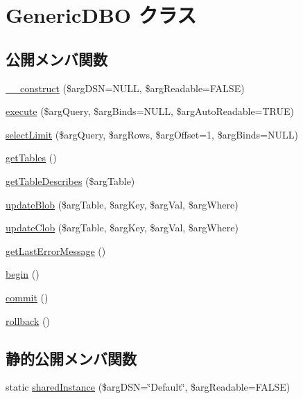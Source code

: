 \hypertarget{class_generic_d_b_o}{}\section{Generic\+D\+B\+O クラス}
\label{class_generic_d_b_o}
\subsection*{公開メンバ関数}
\begin{DoxyCompactItemize}
\item 
\hyperlink{class_generic_d_b_o_a43687f2b92b21e709336c42b140b2260}{\+\_\+\+\_\+construct} (\$arg\+D\+S\+N=N\+U\+L\+L, \$arg\+Readable=F\+A\+L\+S\+E)
\item 
\hyperlink{class_generic_d_b_o_aa5b7d961b4297b9aa75baecfdc7d7e5e}{execute} (\$arg\+Query, \$arg\+Binds=N\+U\+L\+L, \$arg\+Auto\+Readable=T\+R\+U\+E)
\item 
\hyperlink{class_generic_d_b_o_af903a44ae7f95879e1bab1fb2ca16450}{select\+Limit} (\$arg\+Query, \$arg\+Rows, \$arg\+Offset=1, \$arg\+Binds=N\+U\+L\+L)
\item 
\hyperlink{class_generic_d_b_o_a9c5bcfb5e09fd7bad746ad57b34415c0}{get\+Tables} ()
\item 
\hyperlink{class_generic_d_b_o_a8db36514aa3f653b8d7642855a1b8188}{get\+Table\+Describes} (\$arg\+Table)
\item 
\hyperlink{class_generic_d_b_o_a3037e110cc320ad3cc63d68894ba1a54}{update\+Blob} (\$arg\+Table, \$arg\+Key, \$arg\+Val, \$arg\+Where)
\item 
\hyperlink{class_generic_d_b_o_a39d5c487e235013fdd186fd8960b3f5a}{update\+Clob} (\$arg\+Table, \$arg\+Key, \$arg\+Val, \$arg\+Where)
\item 
\hyperlink{class_generic_d_b_o_a81277b8636d6a2d29e6fe993024f703b}{get\+Last\+Error\+Message} ()
\item 
\hyperlink{class_generic_d_b_o_a19a06d2fa3a5770765358c09602a9b75}{begin} ()
\item 
\hyperlink{class_generic_d_b_o_a9054647399f072971033252d135e71d3}{commit} ()
\item 
\hyperlink{class_generic_d_b_o_a47aed86a9d3307c24cffba8f596a553c}{rollback} ()
\end{DoxyCompactItemize}
\subsection*{静的公開メンバ関数}
\begin{DoxyCompactItemize}
\item 
static \hyperlink{class_generic_d_b_o_a4b2bae77e8ef401ed8e06968b09af3a4}{shared\+Instance} (\$arg\+D\+S\+N=\char`\"{}Default\char`\"{}, \$arg\+Readable=F\+A\+L\+S\+E)
\end{DoxyCompactItemize}

